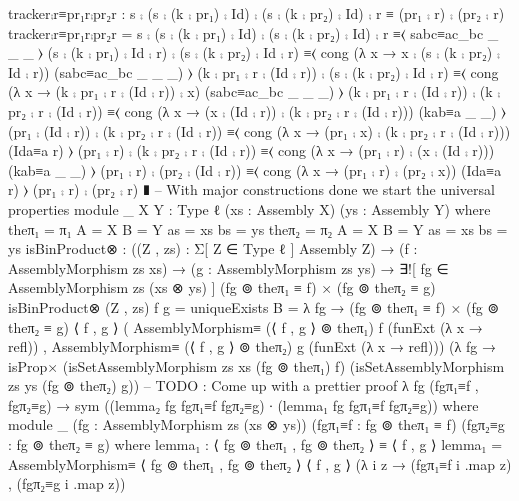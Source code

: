             tracker⨾r≡pr₁r⨾pr₂r : s ⨾ (s ⨾ (k ⨾ pr₁) ⨾ Id) ⨾ (s ⨾ (k ⨾ pr₂) ⨾ Id) ⨾ r ≡ (pr₁ ⨾ r) ⨾ (pr₂ ⨾ r)
            tracker⨾r≡pr₁r⨾pr₂r =
              s ⨾ (s ⨾ (k ⨾ pr₁) ⨾ Id) ⨾ (s ⨾ (k ⨾ pr₂) ⨾ Id) ⨾ r
                ≡⟨ sabc≡ac_bc _ _ _  ⟩
              (s ⨾ (k ⨾ pr₁) ⨾ Id ⨾ r) ⨾ (s ⨾ (k ⨾ pr₂) ⨾ Id ⨾ r)
                ≡⟨ cong (λ x → x ⨾ (s ⨾ (k ⨾ pr₂) ⨾ Id ⨾ r)) (sabc≡ac_bc _ _ _)  ⟩
              (k ⨾ pr₁ ⨾ r ⨾ (Id ⨾ r)) ⨾ (s ⨾ (k ⨾ pr₂) ⨾ Id ⨾ r)
                ≡⟨ cong (λ x → (k ⨾ pr₁ ⨾ r ⨾ (Id ⨾ r)) ⨾ x) (sabc≡ac_bc _ _ _) ⟩
              (k ⨾ pr₁ ⨾ r ⨾ (Id ⨾ r)) ⨾ (k ⨾ pr₂ ⨾ r ⨾ (Id ⨾ r))
                ≡⟨ cong (λ x → (x ⨾ (Id ⨾ r)) ⨾ (k ⨾ pr₂ ⨾ r ⨾ (Id ⨾ r))) (kab≡a _ _) ⟩
              (pr₁ ⨾ (Id ⨾ r)) ⨾ (k ⨾ pr₂ ⨾ r ⨾ (Id ⨾ r))
                ≡⟨ cong (λ x → (pr₁ ⨾ x) ⨾ (k ⨾ pr₂ ⨾ r ⨾ (Id ⨾ r))) (Ida≡a r) ⟩
              (pr₁ ⨾ r) ⨾ (k ⨾ pr₂ ⨾ r ⨾ (Id ⨾ r))
                ≡⟨ cong (λ x → (pr₁ ⨾ r) ⨾ (x ⨾ (Id ⨾ r))) (kab≡a _ _)  ⟩
              (pr₁ ⨾ r) ⨾ (pr₂ ⨾ (Id ⨾ r))
                ≡⟨ cong (λ x → (pr₁ ⨾ r) ⨾ (pr₂ ⨾ x)) (Ida≡a r) ⟩
              (pr₁ ⨾ r) ⨾ (pr₂ ⨾ r)
              ∎
  -- With major constructions done we start the universal properties
  module _ {X Y : Type ℓ} (xs : Assembly X) (ys : Assembly Y) where
    theπ₁ = π₁ {A = X} {B = Y} {as = xs} {bs = ys}
    theπ₂ = π₂ {A = X} {B = Y} {as = xs} {bs = ys}
    isBinProduct⊗ : ((Z , zs) : Σ[ Z ∈ Type ℓ ] Assembly Z)
                   → (f : AssemblyMorphism zs xs)
                   → (g : AssemblyMorphism zs ys)
                   → ∃![ fg ∈ AssemblyMorphism zs (xs ⊗ ys) ] (fg ⊚ theπ₁ ≡ f) × (fg ⊚ theπ₂ ≡ g)
    isBinProduct⊗ (Z , zs) f g =
                  uniqueExists
                    {B = λ fg → (fg ⊚ theπ₁ ≡ f) × (fg ⊚ theπ₂ ≡ g)}
                    ⟨ f , g ⟩
                    ( AssemblyMorphism≡ (⟨ f , g ⟩ ⊚ theπ₁) f (funExt (λ x → refl))
                    , AssemblyMorphism≡ (⟨ f , g ⟩ ⊚ theπ₂) g (funExt (λ x → refl)))
                    (λ fg → isProp×
                            (isSetAssemblyMorphism zs xs (fg ⊚ theπ₁) f)
                            (isSetAssemblyMorphism zs ys (fg ⊚ theπ₂) g))
                    -- TODO : Come up with a prettier proof
                    λ fg (fgπ₁≡f , fgπ₂≡g) → sym ((lemma₂ fg fgπ₁≡f fgπ₂≡g) ∙ (lemma₁ fg fgπ₁≡f fgπ₂≡g)) where
                      module _ (fg : AssemblyMorphism zs (xs ⊗ ys))
                               (fgπ₁≡f : fg ⊚ theπ₁ ≡ f)
                               (fgπ₂≡g : fg ⊚ theπ₂ ≡ g) where
                             lemma₁ : ⟨ fg ⊚ theπ₁ , fg ⊚ theπ₂ ⟩ ≡ ⟨ f , g ⟩
                             lemma₁ = AssemblyMorphism≡
                                      ⟨ fg ⊚ theπ₁ , fg ⊚ theπ₂ ⟩
                                      ⟨ f , g ⟩
                                      (λ i z → (fgπ₁≡f i .map z) , (fgπ₂≡g i .map z))

